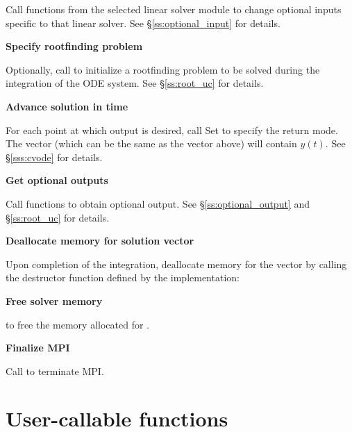 \begin{Steps}
  Call  functions from the selected linear solver module to
  change optional inputs specific to that linear solver.
  See \S\ref{ss:optional_input} for details.

\item
  {\bf Specify rootfinding problem}

  Optionally, call  to initialize a rootfinding problem
  to be solved during the integration of the ODE system.
  See \S\ref{ss:root_uc} for details.

\item
  {\bf Advance solution in time}

  For each point at which output is desired, call
  Set  to specify the return mode.
  The vector  (which can be the same as
  the vector  above) will contain $y(t)$.
  See \S\ref{sss:cvode} for details.
  
\item
  {\bf Get optional outputs}

  Call  functions to obtain optional output.
  See \S\ref{ss:optional_output} and \S\ref{ss:root_uc} for details.

\item
  {\bf Deallocate memory for solution vector}

  Upon completion of the integration, deallocate memory for the vector 
  by calling the destructor function defined by the {\nvector} implementation:

  {\s} 

  {\p} 
  
\item
  {\bf Free solver memory}

   to free the memory allocated for {\cvode}.
  
\item 
  {\bf {\p} Finalize MPI}

  Call  to terminate MPI.
  
\end{Steps}

\section{User-callable functions}\label{ss:cvode_fct_sim}

